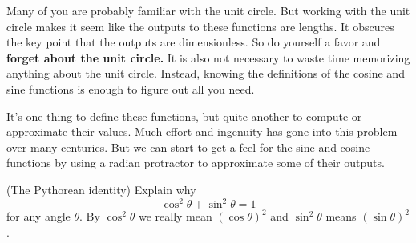 \documentclass{ximera}
\begin{document}
Many of you are probably familiar with the unit circle. But working with the unit circle makes it seem like the outputs to these functions are lengths. It obscures the key point that the outputs are dimensionless. So do yourself a favor and {\bf forget about the unit circle.} It is also not necessary to waste time memorizing anything about the unit circle. Instead, knowing the definitions of the cosine and sine functions is enough to figure out all you need.

It's one thing to define these functions, but quite another to compute or approximate their values. Much effort and ingenuity has gone into this problem over many centuries. But we can start to get a feel for the sine and cosine functions by using a radian protractor to approximate some of their outputs.


\iffalse  
***************************************************************

Returning to our problem that started this chapter where the polar angle was $\theta=4$, we can use a caclulator to find that
\[
  \cos 4 \sim -0.6536
\]
and
\[
   \sin 4 \sim -0.7568
\]
So our coordinates after walking $100$ meters directly away from the origin are 
\[
     x = r\cos \theta = (100 \text{ m})\cos 4 \sim -65.36\text{ m}
\]
and
\[
     y = r\cos \theta = (100 \text{ m})\sin 4 \sim -75.68\text{ m} .
\]

\begin{question}  \label{QWEREWR:Cosine}
Go back to our work from the opening question using the radian protractor and find our approximate coordinates had we walked $100$ meters directly away from the origin. How do these estimates compare with the estimates from the calculator we just computed?
\end{question}

************************************************************************************
\fi

\begin{question} \label{Q2sdfdfdfttg34hg:Cosine}
(The Pythorean identity) Explain why
\[
  \cos^2\theta + \sin^2 \theta = 1
\]
for any angle $\theta$. By $\cos^2\theta$ we really mean  $(\cos \theta)^2$ and $\sin^2\theta$ means $(\sin\theta)^2$.

\end{question}
\end{document}
